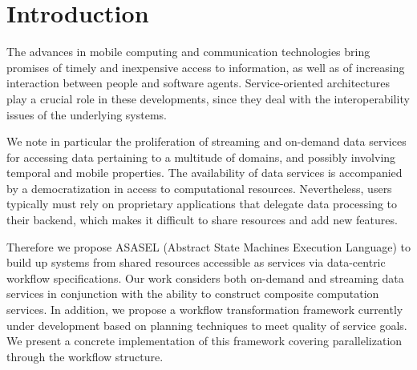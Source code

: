 	
\section{Introduction}\label{sec:asasel:intro}

The advances in mobile computing and communication technologies bring promises of timely and inexpensive access to information, as well as of increasing interaction between people and software agents. Service-oriented architectures play a crucial role in these developments, since they  deal with the interoperability issues of the underlying systems.

We note in particular the proliferation of streaming and on-demand data services for accessing data pertaining to a multitude of domains, and possibly involving temporal and mobile properties. The availability of data services is accompanied by a democratization in access to computational resources. Nevertheless, users typically must rely on proprietary applications that delegate data processing to their backend, which makes it difficult to share resources and add new features.	
	
Therefore we propose ASASEL (Abstract State Machines Execution Language) to build up systems from shared resources accessible as services via data-centric workflow specifications. Our work considers both on-demand and streaming data services in conjunction with the ability to construct composite computation services. In addition, we propose a workflow transformation framework currently under development based on planning techniques to meet quality of service goals. We present a concrete implementation of this framework covering parallelization through the workflow structure.


